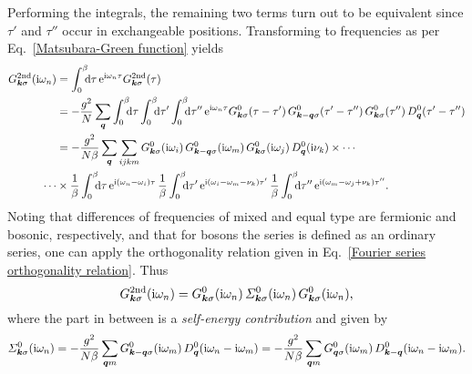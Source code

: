 Performing the integrals, the remaining two terms turn out to be equivalent
since $\tau'$ and $\tau''$ occur in exchangeable positions. Transforming to
 frequencies as per Eq.~\ref{Matsubara-Green function} yields
%
\begin{align*}
    G \super{2nd}_{\vec k \sigma}(\I \omega_n)
    &= \int \from 0 \till \beta \D \tau \,
    \E^{\I \omega_n \tau} G \super{2nd}_{\vec k \sigma}(\tau) \\
    &= -\frac {g^2} N \sum_{\vec q}
    \int \from 0 \till \beta \D \tau
    \int \from 0 \till \beta \D \tau'
    \int \from 0 \till \beta \D \tau'' \,
    \E^{\I \omega_n \tau}
    G^0_{\vec k \sigma}(\tau - \tau') \,
    G^0_{\vec k - \vec q \sigma}(\tau' - \tau'') \,
    G^0_{\vec k \sigma}(\tau'') \,
    D^0_{\vec q}(\tau' - \tau'') \\
    &= -\frac {g^2}{N \beta} \sum_{\vec q} \sum_{i j k m}
    G^0_{\vec k \sigma}(\I \omega_i) \,
    G^0_{\vec k - \vec q \sigma}(\I \omega_m) \,
    G^0_{\vec k \sigma}(\I \omega_j) \,
    D^0_{\vec q}(\I \nu_k) \times \cdots \\
    \cdots &\times
    \frac 1 \beta \int \from 0 \till \beta \D \tau \,
    \E^{\I (\omega_n - \omega_i) \tau} \,
    \frac 1 \beta \int \from 0 \till \beta \D \tau' \,
    \E^{\I (\omega_i - \omega_m - \nu_k) \tau'} \,
    \frac 1 \beta \int \from 0 \till \beta \D \tau'' \,
    \E^{\I (\omega_m - \omega_j + \nu_k) \tau''}.
\end{align*}
%
Noting that differences of  frequencies of mixed and equal type
are fermionic and bosonic, respectively, and that for bosons the
 series is defined as an ordinary  series,
one can apply the orthogonality relation given in Eq.~\ref{Fourier series
orthogonality relation}. Thus
%
\begin{equation*}
    G \sp{\text{2nd}}_{\boldsymbol k \sigma}(\mathrm i \omega_n) =
    G^0_{\boldsymbol k \sigma}(\mathrm i \omega_n) \,
    \varSigma^0_{\boldsymbol k \sigma}(\mathrm i \omega_n) \,
    G^0_{\boldsymbol k \sigma}(\mathrm i \omega_n),
\end{equation*}
%
where the part in between is a \emph{self-energy contribution} and given by
%
\begin{equation*}
    \varSigma^0_{\boldsymbol k \sigma}(\mathrm i \omega_n)
    = -\frac {g^2}{N \beta} \sum_{\boldsymbol q m}
    G^0_{\boldsymbol k - \boldsymbol q \sigma}(\mathrm i \omega_m) \,
    D^0_{\boldsymbol q}(\mathrm i \omega_n - \mathrm i \omega_m)
    = -\frac {g^2}{N \beta} \sum_{\boldsymbol q m}
    G^0_{\boldsymbol q \sigma}(\mathrm i \omega_m) \,
    D^0_{\boldsymbol k - \boldsymbol q}(\mathrm i \omega_n - \mathrm i \omega_m).
\end{equation*}

